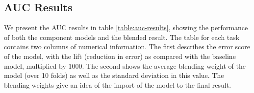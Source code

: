 \documentclass{article}
\begin{document}
\subsection{AUC Results}

We present the AUC results in table \ref{table:auc-results}, showing the performance of both the component models and the blended result.  The table for each task contains two columns of numerical information.  The first describes the error score of the model, with the lift (reduction in error) as compared with the baseline model, multiplied by 1000.  The second shows the average blending weight of the model (over 10 folds) as well as the standard deviation in this value.  The blending weights give an idea of the import of the model to the final result.

\end{document}
